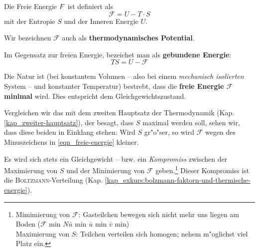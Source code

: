 \begin{Def}
Die Freie Energie $\mathbf \mathcal{F}$ ist definiert als
\begin{equation}
   \label{eqn_freie-energie}
\boxed{
  \mathcal F = U - T \cdot S
}
\end{equation}
mit der Entropie $S$ und der Inneren Energie $U$.  

Wir bezeichnen $\mathcal F$ auch als \textbf{thermodynamisches Potential}.
\end{Def}
%
Im Gegensatz zur freien Energie, bezeichet man als \textbf{gebundene
  Energie}:
\begin{equation}
   \label{eqn_gebundene-energie}
 TS =    U - \mathcal F
\end{equation}
\begin{Wichtig}
    Die Natur ist
   (bei konstantem Volumen -- also bei einem \emph{mechanisch
     isolierten} System -- und konstanter Temperatur) bestrebt, dass
   die \textbf{freie Energie $\mathcal F$ minimal} wird. Dies
   entspricht dem Gleichgewichtszustand.
\end{Wichtig}

Vergleichen wir das mit dem zweiten Hauptsatz der Thermodynamik
(Kap. \ref{kap_zweiter-hauptsatz}), der besagt, dass $S$ maximal
werden soll, sehen wir, dass diese beiden in Einklang stehen: Wird $S$
gr"o"ser, so wird $\mathcal F$ wegen des Minuszeichens in
\eqref{eqn_freie-energie} kleiner.


\begin{Wichtig}
   Es wird sich stets ein Gleichgewicht -- bzw. ein \emph{Kompromiss}
   zwischen der Maximierung von $S$ und der Minimierung von $\mathcal
   F$ geben.\footnote{Mimimierung von $\mathcal F$: Gasteilchen
     bewegen sich nicht mehr uns liegen am Boden ($\mathcal F$ min \Ipl $N\bar
     u$ min \Ipl $\bar u$ min \Ipl $\bar v$ min)\\Maximierung von $S$:
     Teilchen verteilen sich homogen; nehem m"oglichst viel Platz
     ein.}  Dieser Kompromiss ist die \textsc{Boltzmann}-Verteilung
   (Kap.  \ref{kap_exkurs:bolzmann-faktorn-und-thermische-energie}).
\end{Wichtig}






